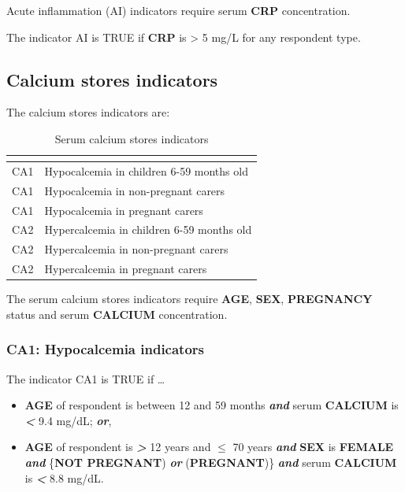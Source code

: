 \documentclass[12pt,a4paper]{article}
\begin{document}
Acute inflammation (AI) indicators require serum \textbf{CRP} concentration.

The indicator AI is TRUE if \textbf{CRP} is \textgreater{} 5 mg/L for any respondent type.

\hypertarget{calcium-stores-indicators}{%
\subsection{Calcium stores indicators}\label{calcium-stores-indicators}}

The calcium stores indicators are:

\begin{table}[H]

\caption{\label{tab:cal1}Serum calcium stores indicators}
\centering
\begin{tabular}[t]{ll}
\toprule
\textbf{} & \textbf{}\\
\midrule
\rowcolor{gray!6}  CA1 & Hypocalcemia in children 6-59 months old\\
CA1 & Hypocalcemia in non-pregnant carers\\
\rowcolor{gray!6}  CA1 & Hypocalcemia in pregnant carers\\
CA2 & Hypercalcemia in children 6-59 months old\\
\rowcolor{gray!6}  CA2 & Hypercalcemia in non-pregnant carers\\
\addlinespace
CA2 & Hypercalcemia in pregnant carers\\
\bottomrule
\end{tabular}
\end{table}

The serum calcium stores indicators require \textbf{AGE}, \textbf{SEX}, \textbf{PREGNANCY} status and serum \textbf{CALCIUM} concentration.

\hypertarget{ca1-hypocalcemia-indicators}{%
\subsubsection{CA1: Hypocalcemia indicators}\label{ca1-hypocalcemia-indicators}}

The indicator CA1 is TRUE if \ldots{}

\begin{itemize}
\item
  \textbf{AGE} of respondent is between 12 and 59 months \textbf{\emph{and}} serum \textbf{CALCIUM} is \textbf{\emph{\textless{}}} 9.4 mg/dL; \textbf{\emph{or}},
\item
  \textbf{AGE} of respondent is \textbf{\emph{\textgreater{}}} 12 years and \textbf{\emph{\(\leq\)}} 70 years \textbf{\emph{and}} \textbf{SEX} is \textbf{FEMALE} \textbf{\emph{and}} \{\textbf{NOT PREGNANT}) \textbf{\emph{or}} (\textbf{PREGNANT})\} \textbf{\emph{and}} serum \textbf{CALCIUM} is \textbf{\emph{\textless{}}} 8.8 mg/dL.
\end{itemize}
\end{document}
